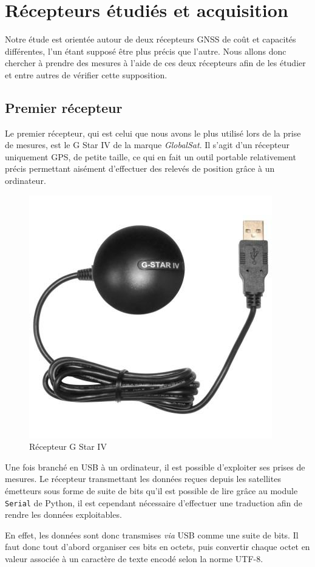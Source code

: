 \section{Récepteurs étudiés et acquisition}\label{sec:recepteurs-etudies-et-acquisition}
   Notre étude est orientée autour de deux récepteurs GNSS de coût et capacités différentes, l'un étant supposé être plus précis que l'autre.
   Nous allons donc chercher à prendre des mesures à l'aide de ces deux récepteurs afin de les étudier et entre autres de vérifier cette supposition.

   \subsection{Premier récepteur}\label{subsec:premier-recepteur-:-gpstar}
      Le premier récepteur, qui est celui que nous avons le plus utilisé lors de la prise de mesures, est le G Star IV de la marque \textit{GlobalSat}.
      Il s'agit d'un récepteur uniquement GPS, de petite taille, ce qui en fait un outil portable relativement précis permettant aisément d'effectuer des relevés de position grâce à un ordinateur.

      \begin{figure}[h]
          \centering
          \includegraphics[width=.4\textwidth]{imgs/gstar}
          \caption{Récepteur G Star IV}
          \label{fig:gstar}
      \end{figure}

      Une fois branché en USB à un ordinateur, il est possible d'exploiter ses prises de mesures.
      Le récepteur transmettant les données reçues depuis les satellites émetteurs sous forme de suite de bits qu'il est possible de lire grâce au module \texttt{Serial} de Python, il est cependant nécessaire d'effectuer une traduction afin de rendre les données exploitables.

      En effet, les données sont donc transmises \textit{via} USB comme une suite de bits.
      Il faut donc tout d'abord organiser ces bits en octets, puis convertir chaque octet en valeur associée à un caractère de texte encodé selon la norme UTF-8.

